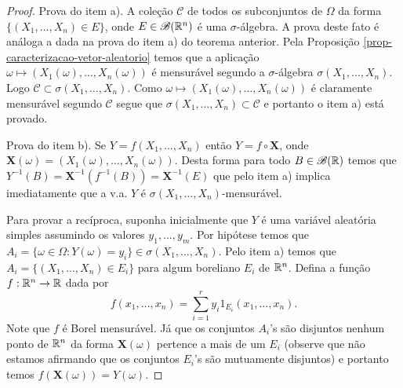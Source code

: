 \begin{proof}
Prova do item a). 
A coleção $\mathcal{C}$ de todos os subconjuntos 
de $\Omega$ da forma 
$\{(X_1,\ldots,X_n)\in E\}$, onde $E\in\mathscr{B}(\mathbb{R}^n)$
é uma $\sigma$-álgebra. A prova deste fato é análoga a dada 
na prova do item a) do teorema anterior.  
Pela Proposição \ref{prop-caracterizacao-vetor-aleatorio}
temos que a aplicação $\omega\mapsto (X_1(\omega),\ldots,X_n(\omega))$
é mensurável segundo a $\sigma$-álgebra $\sigma(X_1,\ldots,X_n)$.
Logo $\mathcal{C}\subset \sigma(X_1,\ldots,X_n)$. 
Como $\omega\mapsto (X_1(\omega),\ldots,X_n(\omega))$ é claramente 
mensurável segundo $\mathcal{C}$ segue que 
$\sigma(X_1,\ldots,X_n)\subset\mathcal{C}$ e portanto o 
item a) está provado.


Prova do item b).
Se $Y=f(X_1,\ldots,X_n)$ então $Y=f\circ \mathbf{X}$,
onde $\mathbf{X}(\omega)=(X_1(\omega),\ldots,X_n(\omega))$.
Desta forma para todo $B\in\mathscr{B}(\mathbb{R})$ temos que 
$Y^{-1}(B)= \mathbf{X}^{-1}(f^{-1}(B))= \mathbf{X}^{-1}(E)$
que pelo item a) implica imediatamente que a v.a. $Y$ 
é $\sigma(X_1,\ldots,X_n)$-mensurável.


Para provar a recíproca, suponha inicialmente 
que $Y$ é uma variável aleatória simples assumindo 
os valores $y_1,\ldots,y_m$. Por hipótese temos que 
$
A_i
=
\{\omega\in\Omega: Y(\omega)=y_i\}
\in 
\sigma(X_1,\ldots,X_n).
$
Pelo item a) temos que $A_i=\{(X_1,\ldots,X_n)\in E_i\}$ 
para algum boreliano $E_i$ de $\mathbb{R}^n$. Defina a função 
$f:\mathbb{R}^n\to\mathbb{R}$ dada por 
	\[
	f(x_1,\ldots,x_n)=\sum_{i=1}^r y_i 1_{E_i}(x_1,\ldots,x_n).
	\]
Note que $f$ é Borel mensurável. 
Já que os conjuntos $A_i$'s são disjuntos nenhum ponto 
de $\mathbb{R}^n$ da forma $\mathbf{X}(\omega)$ pertence a mais 
de um $E_i$ 
(observe que não estamos afirmando que os conjuntos 
$E_i$'s são mutuamente disjuntos)
e portanto temos $f(\mathbf{X}(\omega))=Y(\omega)$.



\end{proof}
